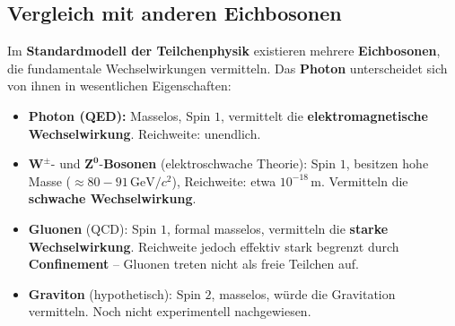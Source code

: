 \subsection{Vergleich mit anderen Eichbosonen}

Im \textbf{Standardmodell der Teilchenphysik} existieren mehrere \textbf{Eichbosonen}, die fundamentale Wechselwirkungen vermitteln.  
Das \textbf{Photon} unterscheidet sich von ihnen in wesentlichen Eigenschaften:

\begin{itemize}
	\item \textbf{Photon (QED):} Masselos, Spin \(1\), vermittelt die \textbf{elektromagnetische Wechselwirkung}.  
	Reichweite: unendlich.
	
	\item \(\mathbf{W^\pm}\)- und \(\mathbf{Z^0}\)-\textbf{Bosonen} (elektroschwache Theorie):  
	Spin \(1\), besitzen hohe Masse (\(\approx 80{-}91\,\mathrm{GeV}/c^2\)), Reichweite: etwa \(10^{-18}\,\mathrm{m}\).  
	Vermitteln die \textbf{schwache Wechselwirkung}.
	
	\item \textbf{Gluonen} (QCD):  
	Spin \(1\), formal masselos, vermitteln die \textbf{starke Wechselwirkung}.  
	Reichweite jedoch effektiv stark begrenzt durch \textbf{Confinement} – Gluonen treten nicht als freie Teilchen auf.
	
	\item \textbf{Graviton} (hypothetisch):  
	Spin \(2\), masselos, würde die Gravitation vermitteln.  
	Noch nicht experimentell nachgewiesen.
\end{itemize}

